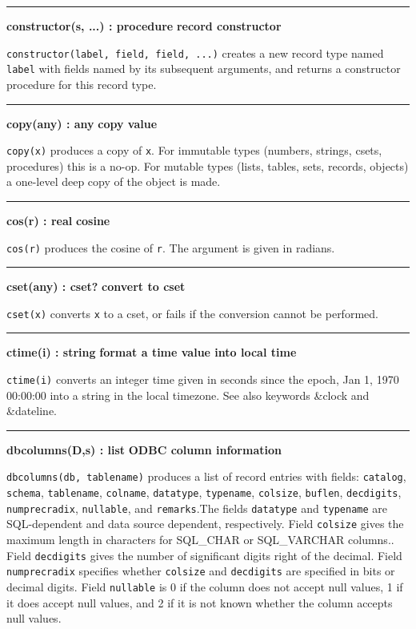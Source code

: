 \bigskip
\hrule\vspace{0.1cm}
\noindent
{\bf constructor(s, ...) : procedure } \hfill {\bf record constructor}

\noindent
{}\texttt{constructor(label, field, field, ...)}
creates a new record type named \texttt{label} with fields named by its
subsequent arguments, and returns a constructor procedure for this
record type.

\bigskip
\hrule\vspace{0.1cm}
\noindent
{\bf copy(any) : any } \hfill {\bf copy value}\WarningNotThreadSafe

\noindent
{}\texttt{copy(x)} produces a copy of \texttt{x}. For immutable
types (numbers, strings, csets, procedures) this is a no-op. For mutable
types (lists, tables, sets, records, objects) a one-level deep copy of
the object is made.

\bigskip\hrule\vspace{0.1cm}
\noindent
{\bf cos(r) : real } \hfill {\bf cosine}

\noindent
{}\texttt{cos(r)} produces the cosine of \texttt{r}. The argument
is given in radians.

\bigskip\hrule\vspace{0.1cm}
\noindent
{\bf cset(any) : cset? } \hfill {\bf convert to cset}

\noindent
{}\texttt{cset(x)} converts \texttt{x} to a cset,
or fails if the conversion cannot be performed.

\bigskip\hrule\vspace{0.1cm}
\noindent
{\bf ctime(i) : string } \hfill {\bf format a time value into local time }

\noindent
{}\texttt{ctime(i)} converts an integer time
given in seconds since the epoch, Jan 1, 1970 00:00:00 into a string in
the local timezone. See also keywords \&clock and \&dateline.

\bigskip\hrule\vspace{0.1cm}
\noindent
{\bf dbcolumns(D,s) : list } \hfill {\bf ODBC column information}

\noindent
{}\texttt{dbcolumns(db, tablename)} produces a list
of record entries with fields:
\texttt{catalog}, \texttt{schema}, \texttt{tablename},
\texttt{colname}, \texttt{datatype}, \texttt{typename}, \texttt{colsize},
\texttt{buflen}, \texttt{decdigits}, \texttt{numprecradix},
\texttt{nullable}, and \texttt{remarks}.The fields
\texttt{datatype} and \texttt{typename} are SQL-dependent and data
source dependent, respectively. Field \texttt{colsize} gives the
maximum length in characters for SQL\_CHAR or SQL\_VARCHAR columns..
Field \texttt{decdigits} gives the number of significant digits right
of the decimal. Field \texttt{numprecradix} specifies whether
\texttt{colsize} and \texttt{decdigits} are specified in bits or
decimal digits. Field \texttt{nullable} is 0 if the column does not
accept null values, 1 if it does accept null values, and 2 if it is not
known whether the column accepts null values.

